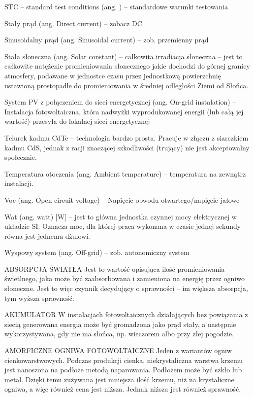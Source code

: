 \documentclass[12pt,a4paper]{article}
\begin{document}
STC – standard test conditions (ang. ) – standardowe warunki testowania

Stały prąd (ang. Direct current) – zobacz DC

Sinusoidalny prąd (ang. Sinusoidal current) – zob. przemienny prąd

Stała słoneczna (ang. Solar constant) – całkowita irradiacja słoneczna – jest to całkowite natężenie promieniowania słonecznego jakie dochodzi do górnej granicy atmosfery, podawane w jednostce czasu przez jednostkową powierzchnię ustawioną prostopadle do promieniowania w średniej odległości Ziemi od Słońca.

System PV z połączeniem do sieci energetycznej (ang. On-grid instalation)  – Instalacja fotowoltaiczna, która nadwyżki wyprodukowanej energii (lub całą jej wartość) przesyła do lokalnej sieci energetycznej


Telurek kadmu CdTe – technologia bardzo prosta. Pracuje w złączu z siarczkiem kadmu CdS, jednak z racji znaczącej szkodliwości (trujący) nie jest akceptowalny społecznie.

Temperatura otoczenia (ang. Ambient temperature) – temperatura na zewnątrz instalacji.

Voc (ang. Open circuit voltage) – Napięcie obwodu otwartego/napięcie jałowe

Wat (ang. watt) [W] – jest to główna jednostka czynnej mocy elektrycznej w układzie SI. Oznacza moc, dla której praca wykonana w czasie jednej sekundy równa jest jednemu dżulowi.

Wyspowy system (ang. Off-grid) – zob. autonomiczny system


ABSORPCJA ŚWIATŁA
Jest to wartość opisująca ilość promieniowania świetlnego, jaka może być zaabsorbowana i zamieniona na energię przez ogniwo słoneczne. Jest to więc czynnik decydujący o sprawności – im większa absorpcja, tym wyższa sprawność.

AKUMULATOR
W instalacjach fotowoltaicznych działających bez powiązania z siecią generowana energia może być gromadzona jako prąd stały, a następnie wykorzystywana, gdy nie ma słońca, np. wieczorem albo przy złej pogodzie.


AMORFICZNE OGNIWA FOTOWOLTAICZNE
Jeden z wariantów ogniw cienkowarstwowych. Podczas produkcji cienka, niekrystaliczna warstwa krzemu jest nanoszona na podłoże metodą naparowania. Podłożem może być szkło lub metal. Dzięki temu zużywana jest mniejsza ilość krzemu, niż na krystaliczne ogniwa, a więc również cena jest niższa. Jednak niższa jest również sprawność.
\end{document}
